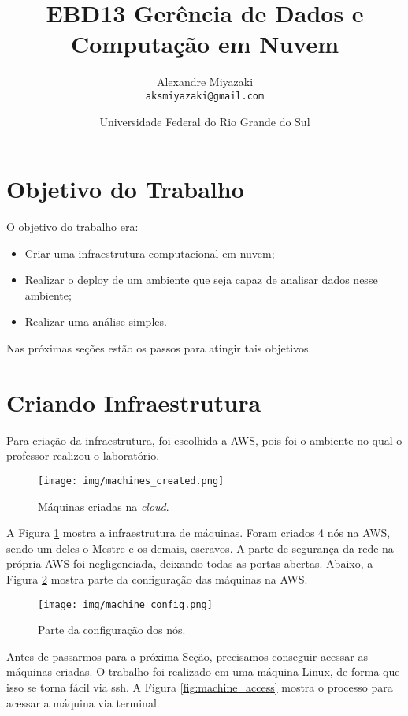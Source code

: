 \documentclass{article}
\title{EBD13 Gerência de Dados e Computação em Nuvem} %
\author{Alexandre Miyazaki\\ \texttt{aksmiyazaki@gmail.com}} %
\date{Universidade Federal do Rio Grande do Sul} %
\begin{document}
\maketitle %

\section*{Objetivo do Trabalho} %

O objetivo do trabalho era:

\begin{itemize}
\item Criar uma infraestrutura computacional em nuvem;
\item Realizar o deploy de um ambiente que seja capaz de analisar dados nesse ambiente;
\item Realizar uma análise simples.
\end{itemize}

Nas próximas seções estão os passos para atingir tais objetivos.


\section{Criando Infraestrutura} %

Para criação da infraestrutura, foi escolhida a AWS, pois foi o ambiente no qual o professor realizou o laboratório.

\begin{figure}[H]
  \texttt{[image: img/machines\_created.png]}
  \caption{Máquinas criadas na \emph{cloud}.}
  \label{fig:fig_maq_criad}
\end{figure}

A Figura \ref{fig:fig_maq_criad} mostra a infraestrutura de máquinas. Foram criados 4 nós na AWS, sendo um deles o Mestre e os demais, escravos. 
A parte de segurança da rede na própria AWS foi negligenciada, deixando todas as portas abertas. Abaixo, a Figura \ref{fig:machine_config} mostra parte da configuração das máquinas na AWS.


\begin{figure}[H]
  \texttt{[image: img/machine\_config.png]}
  \caption{Parte da configuração dos nós.}
  \label{fig:machine_config}
\end{figure}

Antes de passarmos para a próxima Seção, precisamos conseguir acessar as máquinas criadas. O trabalho foi realizado
em uma máquina Linux, de forma que isso se torna fácil via ssh. A Figura \ref{fig:machine_access} mostra o processo para acessar a máquina via terminal.
\end{document}
